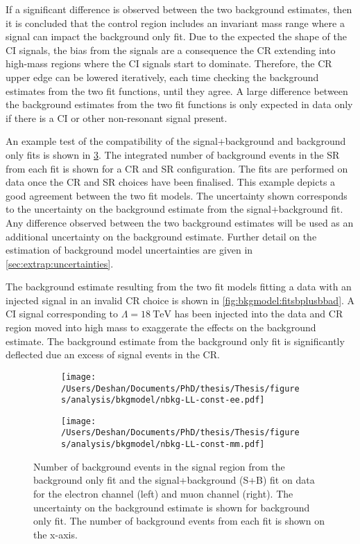 If a significant difference is observed between the two background estimates, then it is concluded that the control region includes an invariant mass range where a signal can impact the background only fit. Due to the expected the shape of the CI signals, the bias from the signals are a consequence the CR extending into high-mass regions where the CI signals start to dominate. Therefore, the CR upper edge can be lowered iteratively, each time checking the background estimates from the two fit functions, until they agree. A large difference between the background estimates from the two fit functions is only expected in data only if there is a CI or other non-resonant signal present. 

An example test of the compatibility of the signal+background and background only fits is shown in \cref{fig:bkgmodel:fitsbplusb}. The integrated number of background events in the SR from each fit is shown for a CR and SR configuration. The fits are performed on data once the CR and SR choices have been finalised. This example depicts a good agreement between the two fit models. The uncertainty shown corresponds to the uncertainty on the background estimate from the signal+background fit. Any difference observed between the two background estimates will be used as an additional uncertainty on the background estimate. Further detail on the estimation of background model uncertainties are given in \cref{sec:extrap:uncertainties}. 

The background estimate resulting from the two fit models fitting a data with an injected signal in an invalid CR choice is shown in \cref{fig:bkgmodel:fitsbplusbbad}. A CI signal corresponding to $\Lambda = \SI{18}{\tera\electronvolt}$ has been injected into the data and CR region moved into high mass to exaggerate the effects on the background estimate. The background estimate from the background only fit is significantly deflected due an excess of signal events in the CR.

\begin{figure}[h!]
    \centering
    \begin{subfigure}[b]{0.49\textwidth}
        \centering
        \texttt{[image: /Users/Deshan/Documents/PhD/thesis/Thesis/figures/analysis/bkgmodel/nbkg-LL-const-ee.pdf]}
        \label{fig:bkgmodel:fitsbplusb1}
    \end{subfigure}
    \begin{subfigure}[b]{0.49\textwidth}
        \centering
        \texttt{[image: /Users/Deshan/Documents/PhD/thesis/Thesis/figures/analysis/bkgmodel/nbkg-LL-const-mm.pdf]}
        \label{fig:bkgmodel:fitsbplusb2}
    \end{subfigure}
    \caption[Background estimation comparisons of the signal+background fit and background only fit]{Number of background events in the signal region from the background only fit and the signal+background (S+B) fit on data for the electron channel (left) and muon channel (right). The uncertainty on the background estimate is shown for background only fit. The number of background events from each fit is shown on the x-axis.}
    \label{fig:bkgmodel:fitsbplusb}
\end{figure}

